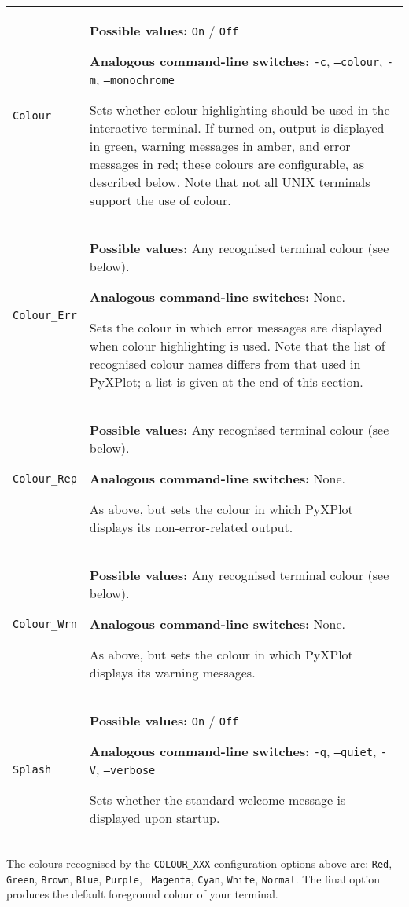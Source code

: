 \begin{longtable}{p{3.4cm}p{9cm}}
{\tt Colour} & {\bf Possible values:} {\tt On} / {\tt Off}

               {\bf Analogous command-line switches:} {\tt -c}, {\tt --colour}, {\tt -m}, {\tt --monochrome}

               Sets whether colour highlighting should be used in the interactive terminal. If turned on, output is displayed in green, warning messages in amber, and error messages in red; these colours are configurable, as described below. Note that not all UNIX terminals support the use of colour.
               \\
{\tt Colour\_Err} & {\bf Possible values:} Any recognised terminal colour (see below).

               {\bf Analogous command-line switches:} None.

               Sets the colour in which error messages are displayed when colour highlighting is used. Note that the list of recognised colour names differs from that used in PyXPlot; a list is given at the end of this section.
               \\
{\tt Colour\_Rep} & {\bf Possible values:} Any recognised terminal colour (see below).

               {\bf Analogous command-line switches:} None.

               As above, but sets the colour in which PyXPlot displays its non-error-related output.
               \\
{\tt Colour\_Wrn} & {\bf Possible values:} Any recognised terminal colour (see below).

               {\bf Analogous command-line switches:} None.

               As above, but sets the colour in which PyXPlot displays its warning messages.
               \\
{\tt Splash} & {\bf Possible values:} {\tt On} / {\tt Off}

               {\bf Analogous command-line switches:} {\tt -q}, {\tt --quiet}, {\tt -V}, {\tt --verbose}

               Sets whether the standard welcome message is displayed upon startup.
               \\
\end{longtable}

The colours recognised by the {\tt COLOUR\_XXX} configuration options above
are: {\tt Red}, {\tt Green}, {\tt Brown}, {\tt Blue}, {\tt Purple}, {\tt
Magenta}, {\tt Cyan}, {\tt White}, {\tt Normal}. The final option produces the
default foreground colour of your terminal.

